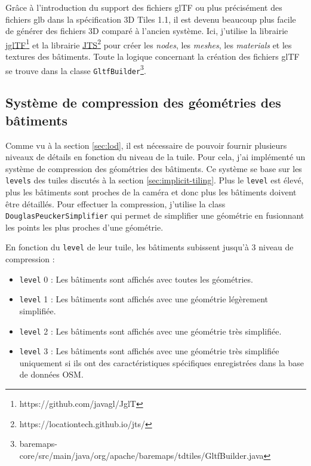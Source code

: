 Grâce à l'introduction du support des fichiers glTF ou plus précisément des fichiers glb dans la spécification 3D Tiles 1.1, il est devenu beaucoup plus facile de générer des fichiers 3D comparé à l'ancien système. Ici, j'utilise la librairie \href{https://github.com/javagl/JglTF}{jglTF}\footnote{https://github.com/javagl/JglT} et la librairie \href{https://locationtech.github.io/jts/}{JTS}\footnote{https://locationtech.github.io/jts/} pour créer les \textit{nodes}, les \textit{meshes}, les \textit{materials} et les textures des bâtiments. Toute la logique concernant la création des fichiers glTF se trouve dans la classe \texttt{GltfBuilder}\footnote{baremaps-core/src/main/java/org/apache/baremaps/tdtiles/GltfBuilder.java}.

\subsection{Système de compression des géométries des bâtiments}

Comme vu à la section \ref{sec:lod}, il est nécessaire de pouvoir fournir plusieurs niveaux de détails en fonction du niveau de la tuile. Pour cela, j'ai implémenté un système de compression des géométries des bâtiments. Ce système se base sur les \texttt{levels} des tuiles discutés à la section \ref{sec:implicit-tiling}. Plus le \texttt{level} est élevé, plus les bâtiments sont proches de la caméra et donc plus les bâtiments doivent être détaillés. Pour effectuer la compression, j'utilise la class \texttt{DouglasPeuckerSimplifier} qui permet de simplifier une géométrie en fusionnant les points les plus proches d'une géométrie.

En fonction du \texttt{level} de leur tuile, les bâtiments subissent jusqu'à 3 niveau de compression :

\begin{itemize}
    \item \texttt{level} 0 : Les bâtiments sont affichés avec toutes les géométries.
    \item \texttt{level} 1 : Les bâtiments sont affichés avec une géométrie légèrement simplifiée.
    \item \texttt{level} 2 : Les bâtiments sont affichés avec une géométrie très simplifiée.
    \item \texttt{level} 3 : Les bâtiments sont affichés avec une géométrie très simplifiée uniquement si ils ont des caractéristiques spécifiques enregistrées dans la base de données OSM.
\end{itemize}

